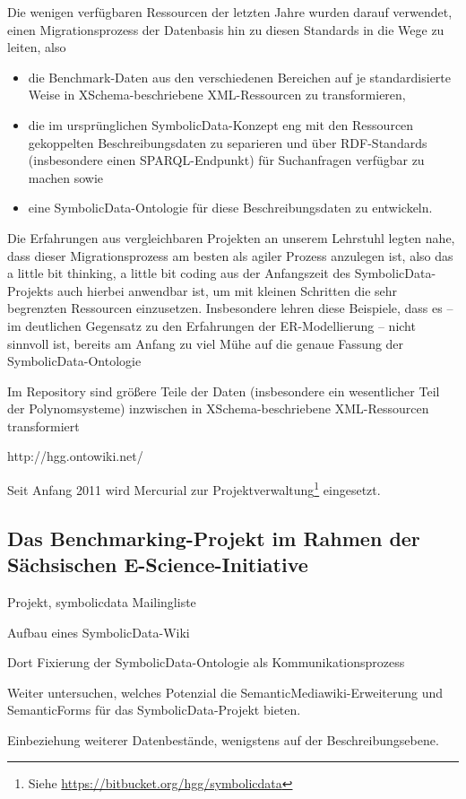 \documentclass{article}
\newcommand{\SD}{{\sc Symbolic\-Data}}
\begin{document}
Die wenigen verfügbaren Ressourcen der letzten Jahre wurden darauf verwendet,
einen Migrationsprozess der Datenbasis hin zu diesen Standards in die Wege zu
leiten, also 
\begin{itemize}
\item die Benchmark-Daten aus den verschiedenen Bereichen auf je
  standardisierte Weise in XSchema-beschriebene XML-Ressourcen zu
  transformieren, 
\item die im ursprünglichen \SD-Konzept eng mit den Ressourcen gekoppelten
  Beschreibungsdaten zu separieren und über RDF-Standards (insbesondere einen
  SPARQL-Endpunkt) für Suchanfragen verfügbar zu machen sowie 
\item eine \SD-Ontologie für diese Beschreibungsdaten zu entwickeln.
\end{itemize}
Die Erfahrungen aus vergleichbaren Projekten an unserem Lehrstuhl legten nahe,
dass dieser Migrationsprozess am besten als agiler Prozess anzulegen ist, also
das {\glqq}a little bit thinking, a little bit coding{\grqq} aus der
Anfangszeit des \SD-Projekts auch hierbei anwendbar ist, um mit kleinen
Schritten die sehr begrenzten Ressourcen einzusetzen.  Insbesondere lehren
diese Beispiele, dass es -- im deutlichen Gegensatz zu den Erfahrungen der
ER-Modellierung -- nicht sinnvoll ist, bereits am Anfang zu viel Mühe
auf die genaue Fassung der \SD-Ontologie

Im Repository sind größere Teile der Daten (insbesondere ein wesentlicher Teil
der Polynomsysteme) inzwischen in XSchema-beschriebene XML-Ressourcen
transformiert


http://hgg.ontowiki.net/



Seit Anfang 2011 wird Mercurial zur Projektverwaltung\footnote{Siehe
  \url{https://bitbucket.org/hgg/symbolicdata}} eingesetzt.

\subsection*{Das Benchmarking-Projekt im Rahmen der Sächsischen
  E-Science-Initiative} 

Projekt, symbolicdata Mailingliste

Aufbau eines \SD-Wiki 

Dort Fixierung der \SD-Ontologie als Kommunikationsprozess 

Weiter untersuchen, welches Potenzial die SemanticMediawiki-Erweiterung und
SemanticForms für das \SD-Projekt bieten.

Einbeziehung weiterer Datenbestände, wenigstens auf der Beschreibungsebene. 
\end{document}
